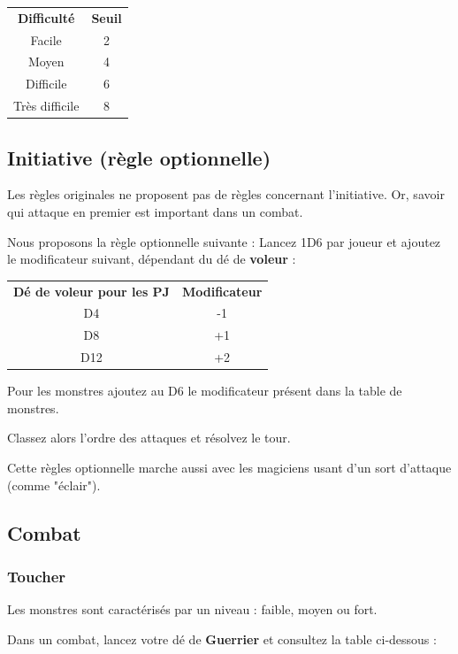 \documentclass[a4paper, 11pt, twoside]{article}
\begin{document}
\newpage

\begin{longtable}{cc}
\textbf{Difficulté} & \textbf{Seuil}\\
Facile & 2\\
Moyen & 4\\
Difficile & 6\\
Très difficile & 8\\
\end{longtable}

\subsection{Initiative (règle optionnelle)}
\label{sec:org7424127}

Les règles originales ne proposent pas de règles concernant l'initiative. Or, savoir qui attaque en premier est important dans un combat.

Nous proposons la règle optionnelle suivante : Lancez 1D6 par joueur et ajoutez le modificateur suivant, dépendant du dé de \textbf{voleur} :

\begin{longtable}{cc}
\textbf{Dé de voleur pour les PJ} & \textbf{Modificateur}\\
D4 & -1\\
D8 & +1\\
D12 & +2\\
\end{longtable}

Pour les monstres ajoutez au D6 le modificateur présent dans la table de monstres.

Classez alors l'ordre des attaques et résolvez le tour.

Cette règles optionnelle marche aussi avec les magiciens usant d'un sort d'attaque (comme "éclair").

\subsection{Combat}
\label{sec:org3d16dbb}
\subsubsection{Toucher}
\label{sec:org72d2550}

Les monstres sont caractérisés par un niveau : faible, moyen ou fort.

Dans un combat, lancez votre dé de \textbf{Guerrier} et consultez la table ci-dessous :
\end{document}
